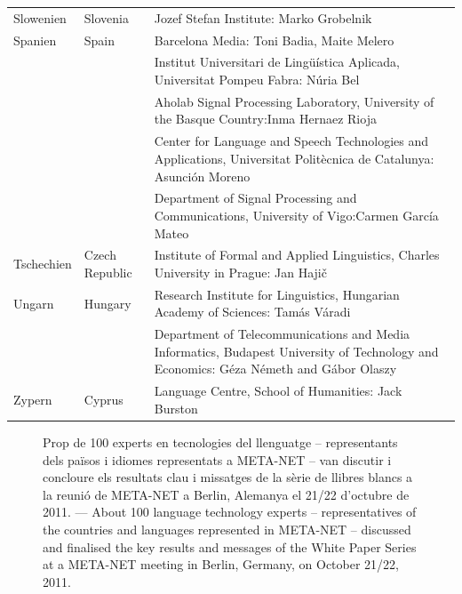\documentclass[]{../../metanetpaper}
\begin{document}
\begin{longtable}{@{}llp{113mm}@{}}
  Slowenien & \textcolor{grey1}{Slovenia} & Jozef Stefan Institute: Marko Grobelnik \\ \addlinespace 
  Spanien & \textcolor{grey1}{Spain} & Barcelona Media: Toni Badia, Maite Melero \\ \addlinespace 
  & & Institut Universitari de Lingüística Aplicada, Universitat Pompeu Fabra: Núria Bel \\ \addlinespace 
  & & Aholab Signal Processing Laboratory, University of the Basque Country:\newline Inma Hernaez Rioja \\ \addlinespace 
  & & Center for Language and Speech Technologies and Applications, Universitat Politècnica de Catalunya:  Asunción Moreno \\ \addlinespace 
  & & Department of Signal Processing and Communications, University of Vigo:\newline Carmen García Mateo \\ \addlinespace 
  Tschechien & \textcolor{grey1}{Czech Republic} & Institute of Formal and Applied Linguistics, Charles University in Prague: Jan Hajič \\ \addlinespace
  Ungarn & \textcolor{grey1}{Hungary} & Research Institute for Linguistics, Hungarian Academy of Sciences: Tamás Váradi\\  \addlinespace
  & & Department of Telecommunications and Media Informatics, Budapest University of Technology and Economics: Géza Németh and Gábor Olaszy\\ \addlinespace
  Zypern & \textcolor{grey1}{Cyprus} & Language Centre, School of Humanities: Jack Burston
\end{longtable}
\normalsize

\renewcommand*{\figureformat}{}
\renewcommand*{\captionformat}{}

\begin{figure}[htbp]
  \center
  \caption{Prop de 100 experts en tecnologies del llenguatge -- representants dels països i idiomes representats a META-NET --  van discutir i concloure els resultats clau i missatges de la sèrie de llibres blancs a la reunió de META-NET a Berlin, Alemanya el 21/22 d'octubre de 2011. ---
 \textcolor{grey1}{About 100 language technology experts -- representatives of the countries and languages represented in META-NET -- discussed and finalised the key results and messages of the White Paper Series at a META-NET meeting in Berlin, Germany, on October 21/22, 2011.}}
  \medskip
\end{figure}
\end{document}
